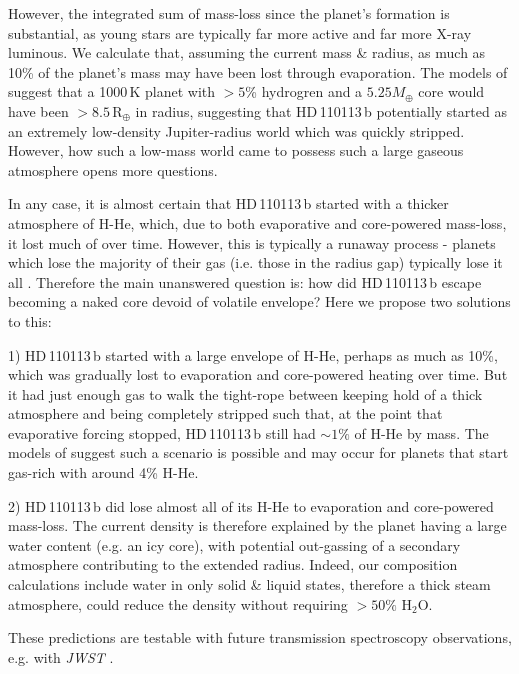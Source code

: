 \documentclass[fleqn,usenatbib]{mnras}
\newcommand{\rearth}{R$_{\oplus}$}
\newcommand{\Tplanet}{HD\,110113\,b}
\begin{document}
However, the integrated sum of mass-loss since the planet's formation is substantial, as young stars are typically far more active and far more X-ray luminous.
We calculate that, assuming the current mass \& radius, as much as 10\% of the planet's mass may have been lost through evaporation.
The models of \citet{zeng2019growth} suggest that a 1000\,K planet with $>5$\% hydrogren and a $5.25M_\oplus$ core would have been $>8.5$\,\rearth{} in radius, suggesting that \Tplanet{} potentially started as an extremely low-density Jupiter-radius world which was quickly stripped.
However, how such a low-mass world came to possess such a large gaseous atmosphere opens more questions.

In any case, it is almost certain that \Tplanet{} started with a thicker atmosphere of H-He, which, due to both evaporative and core-powered mass-loss, it lost much of over time.
However, this is typically a runaway process - planets which lose the majority of their gas (i.e. those in the radius gap) typically lose it all \citep{owen2017evaporation}.
Therefore the main unanswered question is: how did \Tplanet{} escape becoming a naked core devoid of volatile envelope?
Here we propose two solutions to this:

1) \Tplanet{} started with a large envelope of H-He, perhaps as much as 10\%, which was gradually lost to evaporation and core-powered heating over time. 
But it had just enough gas to walk the tight-rope between keeping hold of a thick atmosphere and being completely stripped such that, at the point that evaporative forcing stopped, \Tplanet{} still had $\sim1\%$ of H-He by mass.
The models of \citet[][Figure 5.]{rogers2020unveiling} suggest such a scenario is possible and may occur for planets that start gas-rich with around 4\% H-He.

2) \Tplanet{} did lose almost all of its H-He to evaporation and core-powered mass-loss.
The current density is therefore explained by the planet having a large water content (e.g. an icy core), with potential out-gassing of a secondary atmosphere contributing to the extended radius.
Indeed, our composition calculations include water in only solid \& liquid states, therefore a thick steam \citep[or supercritical][]{mousis2020irradiated} atmosphere, could reduce the density without requiring $>50\%$ H$_{2}$O.

These predictions are testable with future transmission spectroscopy observations, e.g. with \textit{JWST} \citep{2016ApJ...817...17G,2014PASP..126.1134B}.
\end{document}
